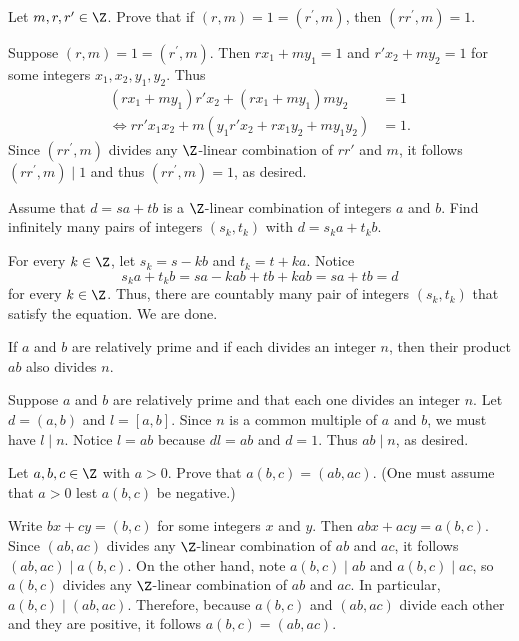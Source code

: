 \begin{questions}
\question
    Let \(m,r,r'\in\Z\).
    Prove that if \((r, m)=1=\left(r^{\prime}, m\right)\), then \(\left(r r^{\prime}, m\right)=1\).
\begin{theproof}
    Suppose \((r, m)=1=\left(r^{\prime}, m\right)\). Then \(rx_1 + my_1 =1\) and \(r'x_2 + my_2 =1\) for some integers \(x_1,x_2,y_1,y_2\). Thus
    \begin{align*}
         (rx_1 + my_1)r'x_2 + (rx_1 + my_1)my_2 &=1\\
    \iff rr'x_1x_2 + m(y_1r'x_2 + rx_1y_2 + my_1y_2)   & = 1.
    \end{align*}
    Since \(\left(r r^{\prime}, m\right)\) divides any \(\Z\)-linear combination of \(rr'\) and \(m\), it follows \(\left(r r^{\prime}, m\right)\mid 1\) and thus \(\left(r r^{\prime}, m\right) = 1\), as desired.
\end{theproof}


\question
    Assume that \(d=s a+t b\) is a \(\Z\)-linear combination of integers \(a\) and \(b\).
    Find infinitely many pairs of integers \(\left(s_k, t_k\right)\) with \(d=s_k a+t_k b\).
\begin{solution}
    For every \(k\in \Z\), let  \(s_k = s-kb\) and \(t_k = t + ka\). Notice   \[
        s_k a + t_k b = sa - kab + tb + kab = sa + tb = d
    \] for every \(k\in \Z\). Thus, there are countably many pair of integers \(\left( s_k, t_k \right)\) that satisfy the equation. We are done.
\end{solution}


\question
    If \(a\) and \(b\) are relatively prime and if each divides an integer \(n\), then their product \(a b\) also divides \(n\).
\begin{theproof}
    Suppose \(a\) and \(b\) are relatively prime and that each one divides an integer \(n\).
    Let \(d= \left( a,b \right)\) and \(l=[a,b]\).
    Since \(n\) is  a common multiple of \(a\) and \(b\), we must have \(l\mid n\).
    Notice \(l=ab\) because   \(dl = ab\) and  \(d=1\). Thus \(ab\mid n\), as desired.
\end{theproof}


\question
Let \(a,b,c\in\Z\) with  \(a>0\). Prove that \(a(b, c)=(a b, a c)\). (One must assume that \(a>0\) lest \(a(b, c)\) be negative.)
\begin{theproof}
    Write \(bx+cy = (b,c)\) for some integers \(x\) and \(y\). Then  \(abx+acy = a(b,c)\). Since \((a b, a c)\) divides any \(\Z\)-linear combination of \(ab\) and  \(ac\), it follows \((a b, a c)\mid a(b,c)\). 
    On the other hand, note \(a(b,c)\mid ab\) and \(a(b,c)\mid ac\), so \(a(b,c)\) divides any \(\Z\)-linear combination of \(ab\) and \(ac\). In particular, \(a(b,c)\mid (ab,ac)\).
    Therefore, because \(a(b,c)\) and \((ab,ac)\) divide each other and they are positive, it follows \(a(b, c)=(a b, a c)\).
\end{theproof}



\end{questions}
